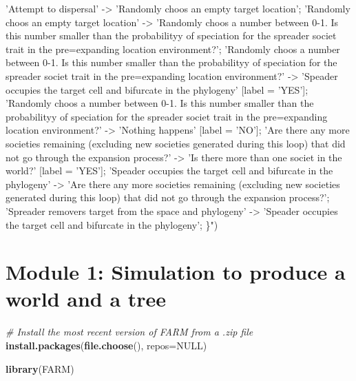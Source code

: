 \documentclass[]{book}
\newenvironment{Shaded}{\begin{snugshade}}{\end{snugshade}}
\newcommand{\KeywordTok}[1]{\textcolor[rgb]{0.13,0.29,0.53}{\textbf{{#1}}}}
\newcommand{\DataTypeTok}[1]{\textcolor[rgb]{0.13,0.29,0.53}{{#1}}}
\newcommand{\StringTok}[1]{\textcolor[rgb]{0.31,0.60,0.02}{{#1}}}
\newcommand{\CommentTok}[1]{\textcolor[rgb]{0.56,0.35,0.01}{\textit{{#1}}}}
\newcommand{\OtherTok}[1]{\textcolor[rgb]{0.56,0.35,0.01}{{#1}}}
\newcommand{\NormalTok}[1]{{#1}}
\theoremstyle{definition}
\theoremstyle{definition}
\theoremstyle{remark}
\begin{document}
\begin{Shaded}
\begin{Highlighting}[]
\StringTok{    'Attempt to dispersal' -> 'Randomly choos an empty target location';}
\StringTok{    'Randomly choos an empty target location' -> 'Randomly choos a number between 0-1. Is this number smaller than the probabilityy of speciation for the spreader societ trait in the pre=expanding location environment?';}
\StringTok{    'Randomly choos a number between 0-1. Is this number smaller than the probabilityy of speciation for the spreader societ trait in the pre=expanding location environment?' -> 'Speader occupies the target cell and bifurcate in the phylogeny' [label = 'YES'];}
\StringTok{    'Randomly choos a number between 0-1. Is this number smaller than the probabilityy of speciation for the spreader societ trait in the pre=expanding location environment?' -> 'Nothing happens' [label = 'NO'];}
\StringTok{  'Are there any more societies remaining (excluding new societies generated during this loop) that did not go through the expansion process?' ->  'Is there more than one societ in the world?' [label = 'YES'];}
\StringTok{  'Speader occupies the target cell and bifurcate in the phylogeny' -> 'Are there any more societies remaining (excluding new societies generated during this loop) that did not go through the expansion process?';}
\StringTok{  'Spreader removers target from the space and phylogeny' -> 'Speader occupies the target cell and bifurcate in the phylogeny';}
\StringTok{  \}"}\NormalTok{)}
\end{Highlighting}
\end{Shaded}

\chapter{Module 1: Simulation to produce a world and a
tree}\label{module-1-simulation-to-produce-a-world-and-a-tree}

\begin{Shaded}
\begin{Highlighting}[]
\CommentTok{# Install the most recent version of FARM from a .zip file}
\KeywordTok{install.packages}\NormalTok{(}\KeywordTok{file.choose}\NormalTok{(), }\DataTypeTok{repos=}\OtherTok{NULL}\NormalTok{) }
\end{Highlighting}
\end{Shaded}

\begin{Shaded}
\begin{Highlighting}[]
\KeywordTok{library}\NormalTok{(FARM)}
\end{Highlighting}
\end{Shaded}
\end{document}
